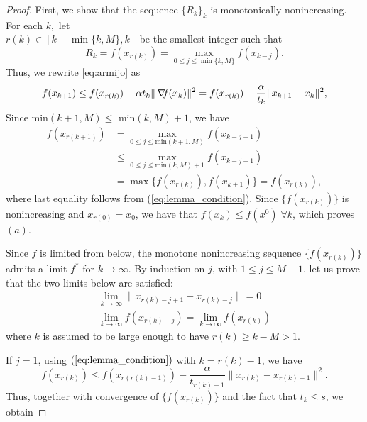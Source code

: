 \documentclass[10pt,a4paper]{article}
\begin{document}
\begin{proof}
	First, we show that the sequence $\{R_k\}_k$ is monotonically nonincreasing. For each $k,$ let \\
	$r(k)\in[k-\min\{k,M\}, k]$ be the smallest integer such that 
\begin{equation*}
	R_k = f(x_{r(k)})=\max_{0\leq j \leq \min\{k,M\}} f(x_{k-j}).
\end{equation*}
Thus, we rewrite \eqref{eq:armijo} as
	\begin{equation}\label{eq:lemma_condition}
		f(x_{k+1}) \leq f(x_{r(k)}) - \alpha t_k \| \operatorname*{\mathit{\nabla \!f}}(x_k)\|^2 = f(x_{r(k)}) - \frac{\alpha}{t_k} \| x_{k+1} -x_k \|^2,
	\end{equation}
	Since min$(k+1, M) \leq $ min$(k, M) +1$, we have
	\begin{equation*}
		\begin{split}
			f(x_{r(k+1)}) &= \displaystyle \max_{0 \leq j \leq \text{min}(k+1, M)} f(x_{k-j+1})\\
			& \leq \displaystyle \max_{0 \leq j \leq \text{min}(k, M) +1} f(x_{k-j+1})\\
			& = \displaystyle \max \{ f(x_{r(k)}), f(x_{k+1})\} = f(x_{r(k)}),
		\end{split}
	\end{equation*}
	where last equality follows from (\ref{eq:lemma_condition}). Since $\{f(x_{r(k)})\}$ is nonincreasing and $x_{r(0)} = x_{0}$, we have that $f(x_k) \leq f(x^0) \; \forall k$, which proves $(a)$.
	\par Since $f$ is limited from below, the monotone nonincreasing sequence $\{f(x_{r(k)})\}$ admits a limit $f^*$ for $k \to \infty$. By induction on $j$, with $1\leq j \leq M+1$, let us prove that the two limits below are satisfied:
	\begin{eqnarray}
		\displaystyle \lim_{k \to \infty} \| x_{r(k) -j +1} -x_{r(k)-j}\| = 0 \label{eq:induction1}\\
		\displaystyle \lim_{k \to \infty} f(x_{r(k) -j}) = \displaystyle \lim_{k\to \infty} f(x_{r(k)}) \label{eq:induction2}
	\end{eqnarray}
	where $k$ is assumed to be large enough to have $r(k) \geq k -M >1.$
	\par If $j=1$, using $(\ref{eq:lemma_condition})$ with $k = r(k) - 1$, we have
	\begin{equation*}
		f(x_{r(k)}) \leq f(x_{r(r(k)-1)}) - \frac{\alpha}{t_{r(k)-1}}\| x_{r(k)} - x_{r(k)-1}\|^2.
	\end{equation*}
	Thus, together with convergence of $\{f(x_{r(k)})\}$ and the fact that $t_k\leq s$, we obtain 

\end{proof}
\end{document}
